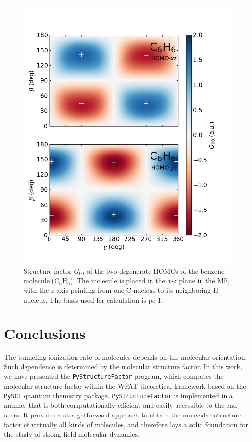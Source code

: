 \documentclass[preprint,12pt]{elsarticle} %
\renewcommand{\rm}[1]{\mathrm{#1}}    %
\begin{document}
\begin{figure}
    \centering
    \includegraphics[width=\columnwidth]{C6H6_Example_sub_20230225.pdf}
    \caption{Structure factor $G_{00}$ of the two degenerate HOMOs of the benzene molecule ($\rm{C}_6 \rm{H}_6$). The molecule is placed in the $x$-$z$ plane in the MF, with the $z$-axis pointing from one C nucleus to its neighboring H nucleus. The basis used for calculation is pc-1.}
    \label{fig:example_C6H6}
\end{figure}


\section{Conclusions}
\label{sec:concl}

The tunneling ionization rate of molecules depends on the molecular orientation. Such dependence is determined by the molecular structure factor. In this work, we have presented the \texttt{PyStructureFactor} program, which computes the molecular structure factor within the WFAT theoretical framework based on the \texttt{PySCF} quantum chemistry package. \texttt{PyStructureFactor} is implemented in a manner that is both computationally efficient and easily accessible to the end users. It provides a straightforward approach to obtain the molecular structure factor of virtually all kinds of molecules, and therefore lays a solid foundation for the study of strong-field molecular dynamics.
\end{document}
